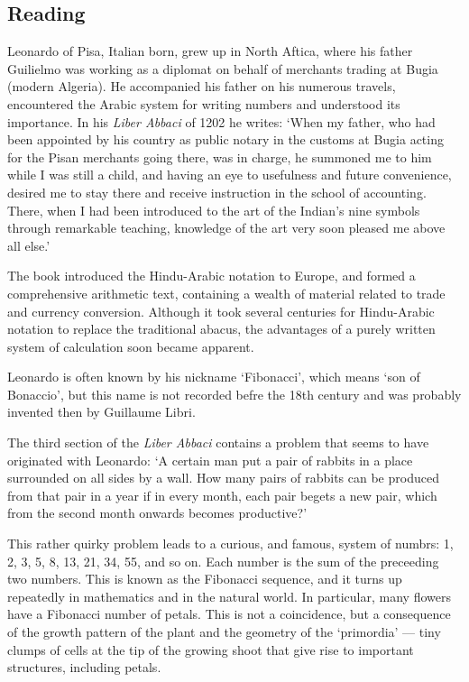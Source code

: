 


\subsection*{Reading}
Leonardo of Pisa, Italian born, grew up in North Aftica, where his father Guilielmo was working as a diplomat on behalf
of merchants trading at Bugia (modern Algeria). He accompanied his father on his numerous travels, encountered the Arabic
system for writing numbers and understood its importance. In his \textit{Liber Abbaci} of 1202 he writes: `When my father,
who had been appointed by his country as public notary in the customs at Bugia acting for the Pisan merchants going there,
was in charge, he summoned me to him while I was still a child, and having an eye to usefulness and future convenience,
desired me to stay there and receive instruction in the school of accounting. There, when I had been introduced to the art
of the Indian's nine symbols through remarkable teaching, knowledge of the art very soon pleased me above all else.'

The book introduced the Hindu-Arabic notation to Europe, and formed a comprehensive arithmetic text, containing a wealth of
material related to trade and currency conversion. Although it took several centuries for Hindu-Arabic notation to replace
the traditional abacus, the advantages of a purely written system of calculation soon became apparent.

Leonardo is often known by his nickname `Fibonacci', which means `son of Bonaccio', but this name is not recorded befre the
18th century and was probably invented then by Guillaume Libri.

The third section of the \textit{Liber Abbaci} contains a problem that seems to have originated with Leonardo: `A certain man
put a pair of rabbits in a place surrounded on all sides by a wall. How many pairs of rabbits can be produced from that pair
in a year if in every month, each pair begets a new pair, which from the second month onwards becomes productive?'

This rather quirky problem leads to a curious, and famous, system of numbrs: 1, 2, 3, 5, 8, 13, 21, 34, 55, and so on. Each
number is the sum of the preceeding two numbers. This is known as the Fibonacci sequence, and it turns up repeatedly in
mathematics and in the natural world. In particular, many flowers have a Fibonacci number of petals. This is not a coincidence,
but a consequence of the growth pattern of the plant and the geometry of the `primordia' --- tiny clumps of cells at the tip of
the growing shoot that give rise to important structures, including petals.

